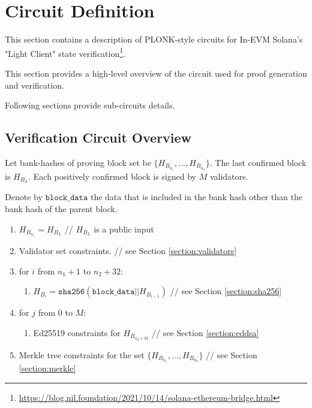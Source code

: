 \section{Circuit Definition}
\label{section:circuit}
This section contains a description of PLONK-style circuits for In-EVM Solana's
"Light Client" state verification\footnote{\url{https://blog.nil.foundation/2021/10/14/solana-ethereum-bridge.html}}.

This section provides a high-level overview of the circuit used for proof generation
and verification.

Following sections provide sub-circuits details.

\subsection{Verification Circuit Overview}

Let bank-hashes of proving block set be $\{H_{B_{n_1}}, ..., H_{B_{n_2}}\}$.
The last confirmed block is $H_{B_{L}}$.
Each positively confirmed block is signed by $M$ validators.

Denote by $\texttt{block\_data}$ the data that is included in the bank hash other than the bank hash of the parent block.

\begin{enumerate}
    \item $H_{B_{n_1}} = H_{B_{L}}$ // $ H_{B_{L}}$ is a public input
    \item Validator set constraints. // see Section \ref{section:validators}
    \item for $i$ from $n_1 + 1$ to $n_2 + 32$:
    \begin{enumerate}
        \item $H_{B_i} = \texttt{sha256}(\texttt{block\_data} || H_{B_{i - 1}})$ // see Section \ref{section:sha256}
    \end{enumerate}
    \item for $j$ from $0$ to $M$:
    \begin{enumerate}
        \item Ed25519 constraints for $H_{B_{n_2 + 32}}$ // see Section \ref{section:eddsa}
    \end{enumerate}
    \item Merkle tree constraints for the set $\{H_{B_{n_1}}, ..., H_{B_{n_2}}\}$ // see Section \ref{section:merkle}
\end{enumerate}
